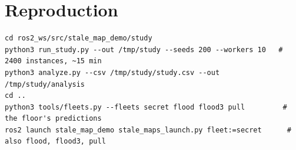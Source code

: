 \documentclass[11pt,a4paper]{article}
\theoremstyle{definition}
\begin{document}
\section*{Reproduction}

\begin{lstlisting}[language={}]
cd ros2_ws/src/stale_map_demo/study
python3 run_study.py --out /tmp/study --seeds 200 --workers 10   # 2400 instances, ~15 min
python3 analyze.py --csv /tmp/study/study.csv --out /tmp/study/analysis
cd ..
python3 tools/fleets.py --fleets secret flood flood3 pull         # the floor's predictions
ros2 launch stale_map_demo stale_maps_launch.py fleet:=secret      # also flood, flood3, pull
\end{lstlisting}
\end{document}
